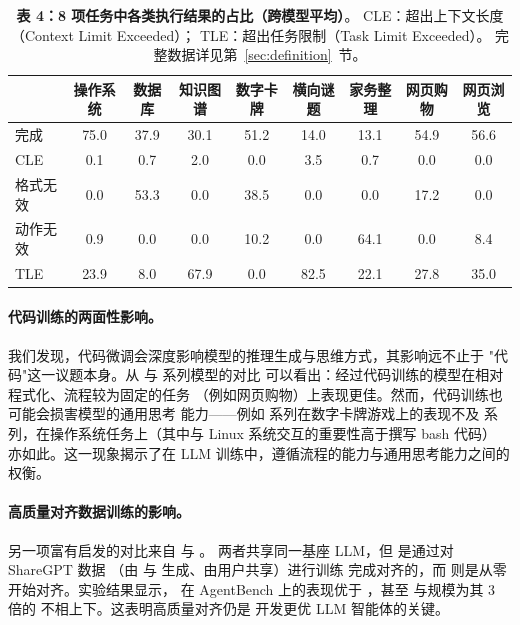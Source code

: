 \begin{table}[t]
    \centering
    \small
    \caption{
        \textbf{表 4：8 项任务中各类执行结果的占比（跨模型平均）}。
        CLE：超出上下文长度（Context Limit Exceeded）；
        TLE：超出任务限制（Task Limit Exceeded）。
        完整数据详见第~\ref{sec:definition}~节。
    }
    \label{tab:outcomes}
    \begin{tabular}{l c c c c c c c c}
        \toprule
        & 操作系统 & 数据库 & 知识图谱 & 数字卡牌 & 横向谜题 & 家务整理 & 网页购物 & 网页浏览 \\
        \midrule
        完成          & 75.0 & 37.9 & 30.1 & 51.2 & 14.0 & 13.1 & 54.9 & 56.6 \\
        CLE          &  0.1 &  0.7 &  2.0 &  0.0 &  3.5 &  0.7 &  0.0 &  0.0 \\
        格式无效      &  0.0 & 53.3 &  0.0 & 38.5 &  0.0 &  0.0 & 17.2 &  0.0 \\
        动作无效      &  0.9 &  0.0 &  0.0 & 10.2 &  0.0 & 64.1 &  0.0 &  8.4 \\
        TLE          & 23.9 &  8.0 & 67.9 &  0.0 & 82.5 & 22.1 & 27.8 & 35.0 \\
        \bottomrule
    \end{tabular}
\end{table}

\paragraph{代码训练的两面性影响。}
我们发现，代码微调会深度影响模型的推理生成与思维方式，其影响远不止于
"代码"这一议题本身。从  与  系列模型的对比
可以看出：经过代码训练的模型在相对程式化、流程较为固定的任务
（例如网页购物）上表现更佳。然而，代码训练也可能会损害模型的通用思考
能力——例如  系列在数字卡牌游戏上的表现不及 
系列，在操作系统任务上（其中与 Linux 系统交互的重要性高于撰写 bash 代码）
亦如此。这一现象揭示了在 LLM 训练中，遵循流程的能力与通用思考能力之间的
权衡。

\paragraph{高质量对齐数据训练的影响。}
另一项富有启发的对比来自  与 。
两者共享同一基座 LLM，但  是通过对 ShareGPT 数据
（由  与  生成、由用户共享）进行训练
完成对齐的，而  则是从零开始对齐。实验结果显示，
 在 AgentBench 上的表现优于 ，甚至
与规模为其 3 倍的  不相上下。这表明高质量对齐仍是
开发更优 LLM 智能体的关键。

